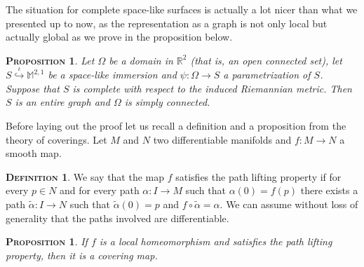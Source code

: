 \documentclass[a4paper,11pt,openright,twoside]{book}
\renewcommand{\Omega}{\varOmega}
\newcommand{\R}{\mathbb{R}}
\newcommand{\M}{\mathbb{M}^{2,1}}
\newcommand{\1}{\mathds{1}}
\theoremstyle{plain}
\newtheorem{prop}[thm]{\textsc{Proposition}}
\theoremstyle{definition}
\newtheorem{defn}[thm]{\textsc{Definition}}
\theoremstyle{remark}
\begin{document}
The situation for complete space-like surfaces is actually a lot nicer than what we presented up to now, as the representation as a graph is not only local but actually global as we prove in the proposition below.
\begin{prop}\label{prop:topproprspimm}
	Let $\Omega$ be a domain in $\R^2$ (that is, an open connected set), let $S \overset{\iota}{\hookrightarrow}\M$ be a space-like immersion and $\psi:\Omega\to S$ a parametrization of $S$. Suppose that $S$ is complete with respect to the induced Riemannian metric. Then $S$ is an entire graph and $\Omega$ is simply connected.

\end{prop}
Before laying out the proof let us recall a definition and a proposition from the theory of coverings. Let $M$ and $N$ two differentiable manifolds and $f:M\to N$ a smooth map.
\begin{defn}
	We say that the map $f$ satisfies the path lifting property if for every $p\in N$ and for every path $\alpha: I \to M$ such that $\alpha(0) = f(p)$ there exists a path $\tilde \alpha: I \to N$ such that $\tilde \alpha(0)=p$ and $f\circ \tilde \alpha = \alpha$. We can assume without loss of generality that the paths involved are differentiable.
\end{defn}
\begin{prop}
	If $f$ is a local homeomorphism and satisfies the path lifting property, then it is a covering map.
\end{prop}
\end{document}
